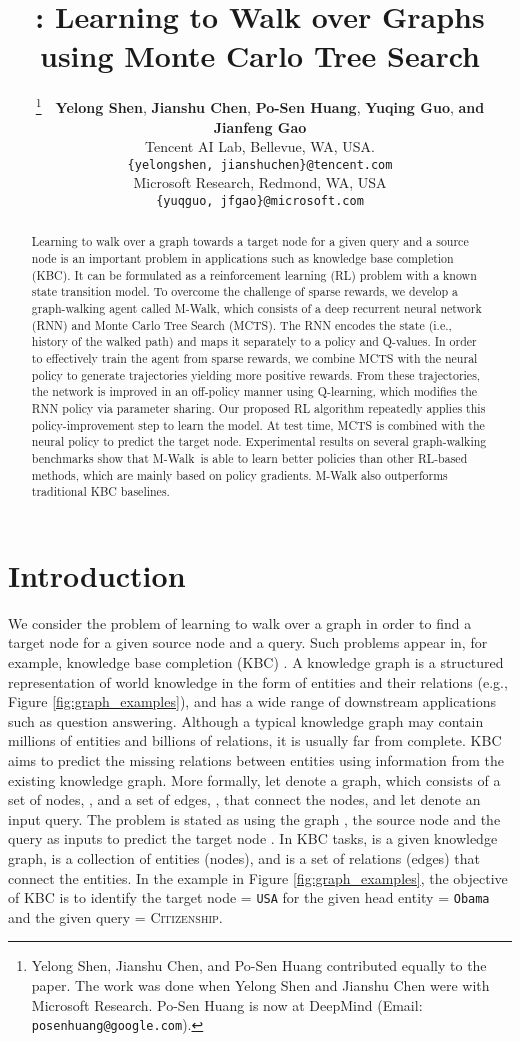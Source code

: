 \documentclass{article}
\title{\modelname: Learning to Walk over Graphs\\ using Monte Carlo Tree Search}
\author{
\thanks{Yelong Shen, Jianshu Chen, and Po-Sen Huang contributed equally to the paper. The work was done when Yelong Shen and Jianshu Chen were with Microsoft Research. Po-Sen Huang is now at DeepMind (Email: \texttt{posenhuang@google.com}).}~~{\bf Yelong Shen},
{\bf Jianshu Chen}, 
{\bf Po-Sen Huang},
{\bf Yuqing Guo},
{\bf and Jianfeng Gao} \\
Tencent AI Lab, Bellevue, WA, USA. \\
\texttt{\{yelongshen, jianshuchen\}@tencent.com}  \\
Microsoft Research, Redmond, WA, USA \\
\texttt{\{yuqguo, jfgao\}@microsoft.com}
}
\newcommand{\modelname}{M-Walk}
\begin{document}
\maketitle
		
\begin{abstract}
Learning to walk over a graph towards a target node for a given query and a source node is an important problem in applications such as knowledge base completion (KBC). It can be formulated as a reinforcement learning (RL) problem with a known state transition model. To overcome the challenge of sparse rewards, we develop a graph-walking agent called \modelname, which consists of a deep recurrent neural network (RNN) and Monte Carlo Tree Search (MCTS). The RNN encodes the state (i.e., history of the walked path) and maps it separately to a policy and Q-values. In order to effectively train the agent from sparse rewards, we combine MCTS with the neural policy to generate trajectories yielding more positive rewards. From these trajectories, the network is improved in an off-policy manner using Q-learning, which modifies the RNN policy via parameter sharing. Our proposed RL algorithm repeatedly applies this policy-improvement step to learn the model. At test time, MCTS is combined with the neural policy to predict the target node. Experimental results on several graph-walking benchmarks show that \modelname~is able to learn better policies than other RL-based methods, which are mainly based on policy gradients. M-Walk also outperforms traditional KBC baselines.
\end{abstract}
	
	
\section{Introduction}


	We consider the problem of learning to walk over a graph in order to find a target node for a given source node and a query. Such problems appear in, for example, knowledge base completion (KBC) \cite{DeepPath,lin2015learning,trouillon2017knowledge,NickelTrKr11,gaosurvey}. A knowledge graph is a structured representation of world knowledge in the form of entities and their relations (e.g., Figure \ref{fig:graph_examples}), and has a wide range of downstream applications such as question answering. Although a typical knowledge graph may contain millions of entities and billions of relations, it is usually far from complete. KBC aims to predict the missing relations between entities using information from the existing knowledge graph.
	More formally, let  denote a graph, which consists of a set of nodes, , and a set of edges, , that connect the nodes, and let  denote an input query. The problem is stated as using the graph , the source node  and the query  as inputs to predict the target node . In KBC tasks,  is a given knowledge graph,  is a collection of entities (nodes), and  is a set of relations (edges) that connect the entities. In the example in Figure \ref{fig:graph_examples}, the objective of KBC is to identify the target node  = \texttt{USA} for the given head entity  = \texttt{Obama} and the given query  = \textsc{Citizenship}.
	
\end{document}
